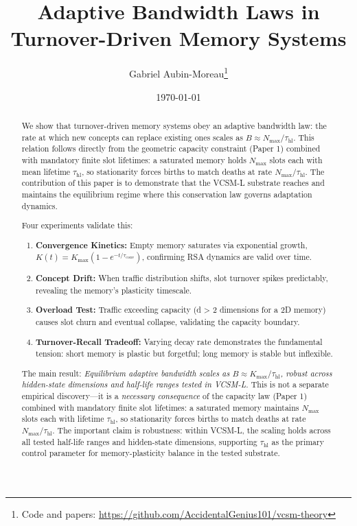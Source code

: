 \documentclass[11pt]{article}
\title{Adaptive Bandwidth Laws in Turnover-Driven Memory Systems}
\author{Gabriel Aubin-Moreau\thanks{Code and papers: \url{https://github.com/AccidentalGenius101/vcsm-theory}}}
\date{\today}
\begin{document}
\maketitle

\begin{abstract}
We show that turnover-driven memory systems obey an adaptive bandwidth law: the rate at which new concepts can replace existing ones scales as $B \approx N_{\max}/\tau_{\text{hl}}$.
This relation follows directly from the geometric capacity constraint (Paper 1) combined with mandatory finite slot lifetimes: a saturated memory holds $N_{\max}$ slots each with mean lifetime $\tau_{\text{hl}}$, so stationarity forces births to match deaths at rate $N_{\max}/\tau_{\text{hl}}$.
The contribution of this paper is to demonstrate that the VCSM-L substrate reaches and maintains the equilibrium regime where this conservation law governs adaptation dynamics.

Four experiments validate this:
\begin{enumerate}
  \item \textbf{Convergence Kinetics:} Empty memory saturates via exponential growth, $K(t) = K_{\max}(1 - e^{-t/\tau_{\text{conv}}})$, confirming RSA dynamics are valid over time.
  \item \textbf{Concept Drift:} When traffic distribution shifts, slot turnover spikes predictably, revealing the memory's plasticity timescale.
  \item \textbf{Overload Test:} Traffic exceeding capacity (d > 2 dimensions for a 2D memory) causes slot churn and eventual collapse, validating the capacity boundary.
  \item \textbf{Turnover-Recall Tradeoff:} Varying decay rate demonstrates the fundamental tension: short memory is plastic but forgetful; long memory is stable but inflexible.
\end{enumerate}

The main result: \textit{Equilibrium adaptive bandwidth scales as $B \approx K_{\max}/\tau_{\text{hl}}$, robust across hidden-state dimensions and half-life ranges tested in VCSM-L.}
This is not a separate empirical discovery---it is a \emph{necessary consequence} of the
capacity law (Paper 1) combined with mandatory finite slot lifetimes: a saturated memory
maintains $N_{\max}$ slots each with lifetime $\tau_{\text{hl}}$, so stationarity forces
births to match deaths at rate $N_{\max}/\tau_{\text{hl}}$.
The important claim is robustness: within VCSM-L, the scaling holds across all tested
half-life ranges and hidden-state dimensions, supporting $\tau_{\text{hl}}$ as the
primary control parameter for memory-plasticity balance in the tested substrate.
\end{abstract}
\end{document}
